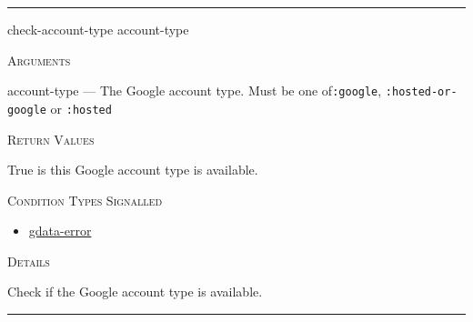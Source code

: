 \documentclass[a4paper]{report}
\begin{document}
  

    \rule{\linewidth}{0.1mm}
    
    \label{cl-gdata-service__fun__check-account-type}
    \begin{defun}[Function]
    check-account-type account-type


    
    \bigskip
    \textsc{Arguments}

account-type
	--- The Google account type. Must be one of\texttt{:google}, \texttt{:hosted-or-google} or \texttt{:hosted}




    
    \bigskip
    \textsc{Return Values}

True is this Google account type is available.


      
    \bigskip
    \textsc{Condition Types Signalled}


 	
    \begin{itemize}
    
	  
    \item
    \hyperref[cl-gdata-service__class__gdata-error]{gdata-error}
    
	
    \end{itemize}
  
      


	
    \bigskip
    \textsc{Details}

Check if the Google account type is available.


    
    \end{defun}
  
  

    \rule{\linewidth}{0.1mm}
    
\end{document}

